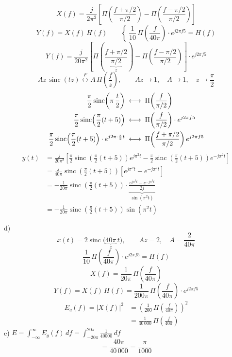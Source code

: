 \documentclass[11pt,a4paper]{article}
\begin{document}
\[
  X(f)=\frac{j}{2\pi^2}\left[\Pi\!\left(\frac{f+\pi/2}{\pi/2}\right)-\Pi\!\left(\frac{f-\pi/2}{\pi/2}\right)\right]
\]
\[
  Y(f)=X(f)\,H(f)\qquad\left\{\ \frac{1}{10}\,\Pi\!\left(\frac{f}{40\pi}\right)\cdot e^{j2\pi f 5}=H(f)\right.
\]
\[
  Y(f)=\frac{j}{20\pi^2}\left[\Pi\!\left(\frac{f+\pi/2}{\underbrace{\pi/2}_{z}}\right)-\Pi\!\left(\frac{f-\pi/2}{\pi/2}\right)\right]\cdot e^{j2\pi f 5}
\]
\[
  Az\,\operatorname{sinc}(tz)\overset{F}{\longleftrightarrow}A\,\Pi\!\left(\frac{f}{z}\right),
  \qquad Az\rightarrow 1,\quad A\rightarrow 1,\quad z\rightarrow\frac{\pi}{2}
\]
\begin{align*}
  \frac{\pi}{2}\operatorname{sinc}\!\left(\pi\,\frac{t}{2}\right)&\;\longleftrightarrow\;\Pi\!\left(\frac{f}{\pi/2}\right)\\
  \frac{\pi}{2}\operatorname{sinc}\!\left(\frac{\pi}{2}(t+5)\right)&\;\longleftrightarrow\;\Pi\!\left(\frac{f}{\pi/2}\right)\cdot e^{j2\pi f 5}\\
  \frac{\pi}{2}\operatorname{sinc}\!\left(\frac{\pi}{2}(t+5)\right)\cdot e^{j2\pi\cdot\frac{\pi}{2}t}&\;\longleftrightarrow\;\Pi\!\left(\frac{f+\pi/2}{\pi/2}\right)e^{j2\pi f 5}
\end{align*}
\begin{align*}
  y(t)&=\frac{j}{20\pi^2}\left[\frac{\pi}{2}\operatorname{sinc}\!\left(\frac{\pi}{2}(t+5)\right)e^{j\pi^2 t}-\frac{\pi}{2}\operatorname{sinc}\!\left(\frac{\pi}{2}(t+5)\right)e^{-j\pi^2 t}\right]\\[2mm]
  &=\frac{j}{40\pi}\operatorname{sinc}\!\left(\frac{\pi}{2}(t+5)\right)\left[e^{j\pi^2 t}-e^{-j\pi^2 t}\right]\\[2mm]
  &=-\frac{1}{20\pi}\operatorname{sinc}\!\left(\frac{\pi}{2}(t+5)\right)\cdot\underbrace{\frac{e^{j\pi^2 t}-e^{-j\pi^2 t}}{2j}}_{\sin(\pi^2 t)}\\[2mm]
  &=-\frac{1}{20\pi}\operatorname{sinc}\!\left(\frac{\pi}{2}(t+5)\right)\sin(\pi^2 t)
\end{align*}

d)
\[
  x(t)=2\operatorname{sinc}\bigl(\underbrace{40\pi}_{z}\,t\bigr),\qquad Az=2,\quad A=\frac{2}{40\pi}
\]
\[
  \frac{1}{10}\,\Pi\!\left(\frac{f}{40\pi}\right)\cdot e^{j2\pi f 5}=H(f)
\]
\[ X(f)=\frac{1}{20\pi}\,\Pi\!\left(\frac{f}{40\pi}\right) \]
\[ Y(f)=X(f)\,H(f)=\frac{1}{200\pi}\,\Pi\!\left(\frac{f}{40\pi}\right)\cdot e^{j2\pi f 5} \]
\begin{align*}
  E_g(f)=|X(f)|^2&=\left(\frac{1}{200}\,\Pi\!\left(\frac{f}{40\pi}\right)\right)^{2}\\
  &=\frac{1}{40\,000}\,\Pi\!\left(\frac{f}{40\pi}\right)
\end{align*}
e) $\displaystyle E=\int_{-\infty}^{\infty}E_g(f)\,df=\int_{-20\pi}^{20\pi}\frac{1}{40000}\,df$
\[ =\frac{40\pi}{40\,000}=\frac{\pi}{1000} \]
\end{document}
